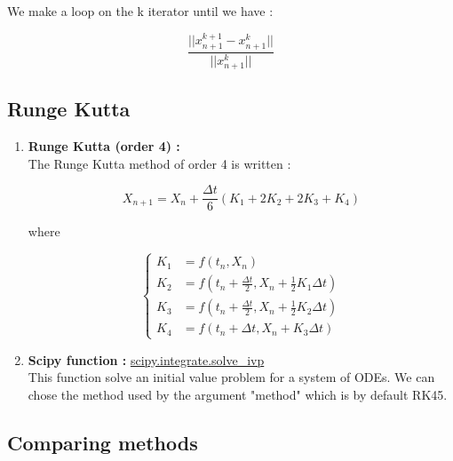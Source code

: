\documentclass[12pt]{article}
\begin{document}
	\noindent We make a loop on the k iterator until we have :
	
	$$\frac{||x_{n+1}^{k+1}-x_{n+1}^k||}{||x_{n+1}^k||}$$
	
	\subsection{Runge Kutta}
	
	\begin{enumerate}[label=\textbullet]
		\item \textbf{Runge Kutta (order 4) :} \\
		The Runge Kutta method of order 4 is written :
		
		$$X_{n+1}=X_n+\frac{\Delta t}{6}\left(K_1+2K_2+2K_3+K_4\right)$$
		
		\noindent where 
		
		$$\left\{\begin{aligned}
			K_1&=f(t_n,X_n) \\
			K_2&=f\left(t_n+\frac{\Delta t}{2},X_n+\frac{1}{2} K_1\Delta t\right) \\
			K_3&=f\left(t_n+\frac{\Delta t}{2},X_n+\frac{1}{2} K_2\Delta t\right) \\
			K_4&=f\left(t_n+\Delta t,X_n+K_3\Delta t\right)
		\end{aligned}\right.$$
		\item \textbf{Scipy function :} \href{https://docs.scipy.org/doc/scipy/reference/generated/scipy.integrate.solve_ivp.html#scipy.integrate.solve_ivp}{scipy.integrate.solve\_ivp} \\
		This function solve an initial value problem for a system of ODEs. We can chose the method used by the argument "method" which is by default RK45. 
	\end{enumerate}
	
	\subsection{Comparing methods}
	
\end{document}
